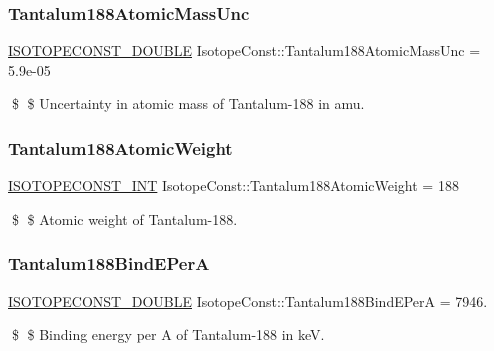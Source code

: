 \subsubsection{\texorpdfstring{Tantalum188\+Atomic\+Mass\+Unc}{Tantalum188AtomicMassUnc}}
{\footnotesize\ttfamily \mbox{\hyperlink{group___isotope_const-_macros_ga8f45a7272ce02c0b4c65c44636ed719a}{I\+S\+O\+T\+O\+P\+E\+C\+O\+N\+S\+T\+\_\+\+D\+O\+U\+B\+LE}} Isotope\+Const\+::\+Tantalum188\+Atomic\+Mass\+Unc = 5.\+9e-\/05}

\$ \$ Uncertainty in atomic mass of Tantalum-\/188 in amu. \mbox{\label{group___isotope_const-_tantalum-_ta188_ga32574c9578e79318248dab5877d17a56}} 
\subsubsection{\texorpdfstring{Tantalum188\+Atomic\+Weight}{Tantalum188AtomicWeight}}
{\footnotesize\ttfamily \mbox{\hyperlink{group___isotope_const-_macros_ga5f18360b3e99483a35c32d789e62621c}{I\+S\+O\+T\+O\+P\+E\+C\+O\+N\+S\+T\+\_\+\+I\+NT}} Isotope\+Const\+::\+Tantalum188\+Atomic\+Weight = 188}

\$ \$ Atomic weight of Tantalum-\/188. \mbox{\label{group___isotope_const-_tantalum-_ta188_gafb2341cd11302a91ffb49384f80c7cda}} 
\subsubsection{\texorpdfstring{Tantalum188\+Bind\+E\+PerA}{Tantalum188BindEPerA}}
{\footnotesize\ttfamily \mbox{\hyperlink{group___isotope_const-_macros_ga8f45a7272ce02c0b4c65c44636ed719a}{I\+S\+O\+T\+O\+P\+E\+C\+O\+N\+S\+T\+\_\+\+D\+O\+U\+B\+LE}} Isotope\+Const\+::\+Tantalum188\+Bind\+E\+PerA = 7946.}

\$ \$ Binding energy per A of Tantalum-\/188 in keV. \mbox{\label{group___isotope_const-_tantalum-_ta188_ga92cdc6e4d4037f1046c0edfff0b11a49}} 
